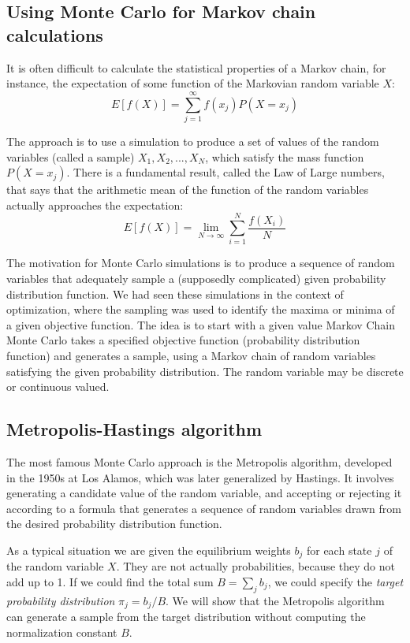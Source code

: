 \documentclass[11pt]{book}
\begin{document}
\subsection{Using Monte Carlo for Markov chain calculations}

It is often difficult to calculate the statistical properties of a Markov chain, for instance, the expectation of some function of the Markovian random variable $X$:
$$ E[f(X)] = \sum_{j=1}^\infty f(x_j) P(X = x_j)$$

The approach is to use a simulation to produce a set of values of the random variables (called a sample) $X_1, X_2, ..., X_N$, which satisfy the mass function $P(X = x_j)$. There is a fundamental result, called the Law of Large numbers, that says that the arithmetic mean of the function of the random variables actually approaches the expectation:
$$ E[f(X)] = \lim_{N \rightarrow \infty}  \sum_{i=1}^N \frac{f(X_i)}{N} $$

The motivation for Monte Carlo simulations is to produce a sequence of random variables that adequately sample a (supposedly complicated) given probability distribution function. We had seen these simulations in the context of optimization, where the sampling was used to identify the maxima or minima of a given objective function. The idea is to start with a given value Markov Chain Monte Carlo takes a specified objective function (probability distribution function) and generates a sample, using a Markov chain of random variables satisfying the given probability distribution. The random variable may be discrete or continuous valued.

\subsection{Metropolis-Hastings algorithm}
The most famous Monte Carlo approach is the Metropolis algorithm, developed in the 1950s at Los Alamos, which was later generalized by Hastings. It involves generating a candidate value of the random variable, and accepting or rejecting it according to a formula that generates a sequence of random variables drawn from the desired probability distribution function.

As a typical situation we are given the equilibrium weights $b_j$ for each state $j$ of the random variable $X$. They are not actually probabilities, because they do not add up to 1. If we could find the total sum $B = \sum_j b_j$, we could specify the \emph{target probability distribution} $\pi_j = b_j /B$. We will show that the Metropolis algorithm can generate a sample from the target distribution without computing the normalization constant $B$.
\end{document}
